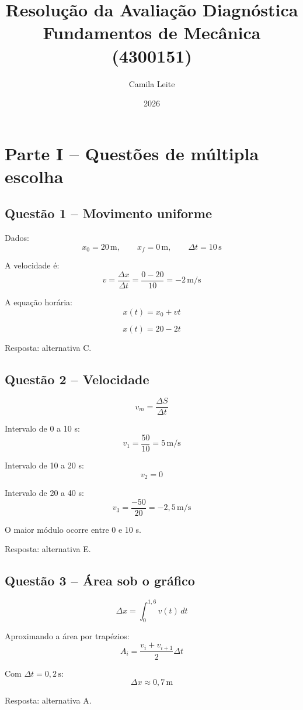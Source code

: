 \documentclass[12pt,a4paper]{article}
\title{
    \textbf{Resolução da Avaliação Diagnóstica}\\
    \large Fundamentos de Mecânica (4300151)
}
\author{Camila Leite}
\date{2026}
\begin{document}
\maketitle

\tableofcontents
\newpage

\section{Parte I -- Questões de múltipla escolha}

\subsection{Questão 1 -- Movimento uniforme}

Dados:
\[
x_0=20\,\mathrm{m},\qquad
x_f=0\,\mathrm{m},\qquad
\Delta t=10\,\mathrm{s}
\]

A velocidade é:
\[
v=\frac{\Delta x}{\Delta t}
=\frac{0-20}{10}=-2\,\mathrm{m/s}
\]

A equação horária:
\[
x(t)=x_0+vt
\]

\[
\boxed{x(t)=20-2t}
\]

Resposta: alternativa C.

\subsection{Questão 2 -- Velocidade}

\[
v_m=\frac{\Delta S}{\Delta t}
\]

Intervalo de 0 a 10 s:
\[
v_1=\frac{50}{10}=5\,\mathrm{m/s}
\]

Intervalo de 10 a 20 s:
\[
v_2=0
\]

Intervalo de 20 a 40 s:
\[
v_3=\frac{-50}{20}=-2,5\,\mathrm{m/s}
\]

O maior módulo ocorre entre 0 e 10 s.

Resposta: alternativa E.

\subsection{Questão 3 -- Área sob o gráfico}

\[
\Delta x=\int_0^{1,6}v(t)\,dt
\]

Aproximando a área por trapézios:
\[
A_i=\frac{v_i+v_{i+1}}{2}\Delta t
\]

Com $\Delta t=0,2\,\mathrm{s}$:
\[
\Delta x\approx0,7\,\mathrm{m}
\]

Resposta: alternativa A.
\end{document}
